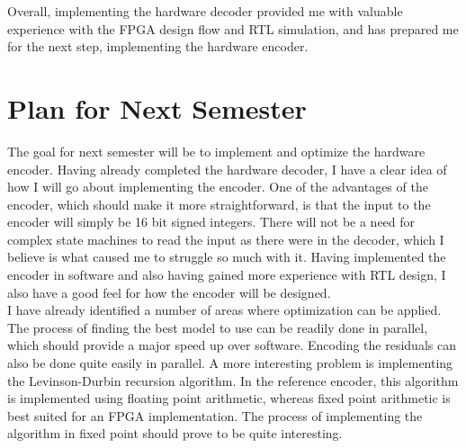 \documentclass[12pt]{scrartcl}
\begin{document}
  Overall, implementing the hardware decoder provided me with valuable experience with the FPGA design flow and RTL simulation, and has prepared me for the next step, implementing the hardware encoder.
  
  \section{Plan for Next Semester}
  The goal for next semester will be to implement and optimize the hardware encoder. Having already completed the hardware decoder, I have a clear idea of how I will go about implementing the encoder. One of the advantages of the encoder, which should make it more straightforward, is that the input to the encoder will simply be 16 bit signed integers. There will not be a need for complex state machines to read the input as there were in the decoder, which I believe is what caused me to struggle so much with it. Having implemented the encoder in software and also having gained more experience with RTL design, I also have a good feel for how the encoder will be designed. \\
      
  I have already identified a number of areas where optimization can be applied. The process of finding the best model to use can be readily done in parallel, which should provide a major speed up over software. Encoding the residuals can also be done quite easily in parallel. A more interesting problem is implementing the Levinson-Durbin recursion algorithm. In the reference encoder, this algorithm is implemented using floating point arithmetic, whereas fixed point arithmetic is best suited for an FPGA implementation. The process of implementing the algorithm in fixed point should prove to be quite interesting.
  
  
  
\end{document}
